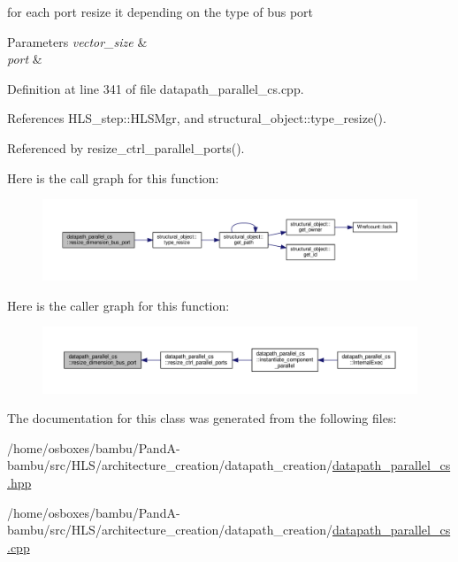 for each port resize it depending on the type of bus port 


\begin{DoxyParams}{Parameters}
{\em vector\+\_\+size} & \\
\hline
{\em port} & \\
\hline
\end{DoxyParams}


Definition at line 341 of file datapath\+\_\+parallel\+\_\+cs.\+cpp.



References H\+L\+S\+\_\+step\+::\+H\+L\+S\+Mgr, and structural\+\_\+object\+::type\+\_\+resize().



Referenced by resize\+\_\+ctrl\+\_\+parallel\+\_\+ports().

Here is the call graph for this function\+:
\nopagebreak
\begin{figure}[H]
\begin{center}
\leavevmode
\includegraphics[width=350pt]{d7/d60/classdatapath__parallel__cs_ae35b3e7cd2b03df2f26fa6a2a1c0ee97_cgraph}
\end{center}
\end{figure}
Here is the caller graph for this function\+:
\nopagebreak
\begin{figure}[H]
\begin{center}
\leavevmode
\includegraphics[width=350pt]{d7/d60/classdatapath__parallel__cs_ae35b3e7cd2b03df2f26fa6a2a1c0ee97_icgraph}
\end{center}
\end{figure}


The documentation for this class was generated from the following files\+:\begin{DoxyCompactItemize}
\item 
/home/osboxes/bambu/\+Pand\+A-\/bambu/src/\+H\+L\+S/architecture\+\_\+creation/datapath\+\_\+creation/\hyperlink{datapath__parallel__cs_8hpp}{datapath\+\_\+parallel\+\_\+cs.\+hpp}\item 
/home/osboxes/bambu/\+Pand\+A-\/bambu/src/\+H\+L\+S/architecture\+\_\+creation/datapath\+\_\+creation/\hyperlink{datapath__parallel__cs_8cpp}{datapath\+\_\+parallel\+\_\+cs.\+cpp}\end{DoxyCompactItemize}

